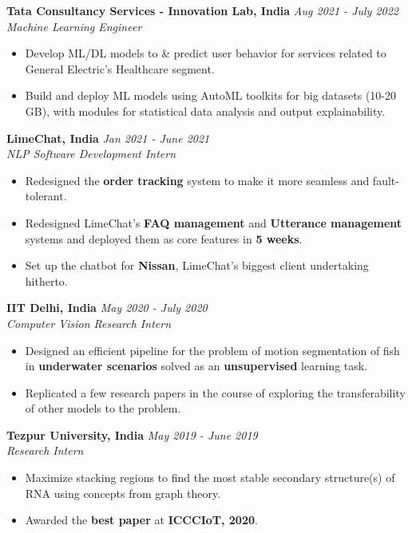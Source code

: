 \documentclass[10pt]{article}
\newenvironment{midlist}[1][\enskip\textbullet]%
        {\begin{itemize}[#1,leftmargin=*,parsep=0pt,itemsep=2pt,topsep=0pt,partopsep=0pt]}
        {\end{itemize}}
\begin{document}
\textbf{Tata Consultancy Services - Innovation Lab, India} \hfill {\textit{Aug 2021 - July 2022}}\\
\emph{Machine Learning Engineer}
\begin{midlist}
    \item Develop ML/DL models to \& predict user behavior for services related to General Electric’s Healthcare segment.
    \item Build and deploy ML models using AutoML toolkits for big datasets (10-20 GB), with modules for statistical data analysis and output explainability.
\end{midlist}
\vspace{2.5mm}

\textbf{LimeChat, India} \hfill {\textit{Jan 2021 - June 2021}}\\
\emph{NLP Software Development Intern}
\begin{midlist}
    \item Redesigned the \textbf{order tracking} system to make it more seamless and fault-tolerant.
    \item Redesigned LimeChat’s \textbf{FAQ management} and \textbf{Utterance management} systems and deployed them as core features in \textbf{5 weeks}.
    \item Set up the chatbot for \textbf{Nissan}, LimeChat’s biggest client undertaking hitherto.
\end{midlist}
\vspace{2.5mm}

\textbf{IIT Delhi, India} \hfill {\textit{May 2020 - July 2020}}\\
\emph{Computer Vision Research Intern}
\begin{midlist}
    \item Designed an efficient pipeline for the problem of motion segmentation of fish in \textbf{underwater scenarios} solved as an \textbf{unsupervised} learning task.
    \item Replicated a few research papers in the course of exploring the transferability of other models to the problem.
\end{midlist}
\vspace{2.5mm}

\textbf{Tezpur University, India} \hfill {\textit{May 2019 - June 2019}}\\
\emph{Research Intern}
\begin{midlist}
    \item Maximize stacking regions to find the most stable secondary structure(s) of RNA using concepts from graph theory.
    \item Awarded the \textbf{best paper} at \textbf{ICCCIoT, 2020}.
\end{midlist}
\vspace{1.0mm}
\end{document}
